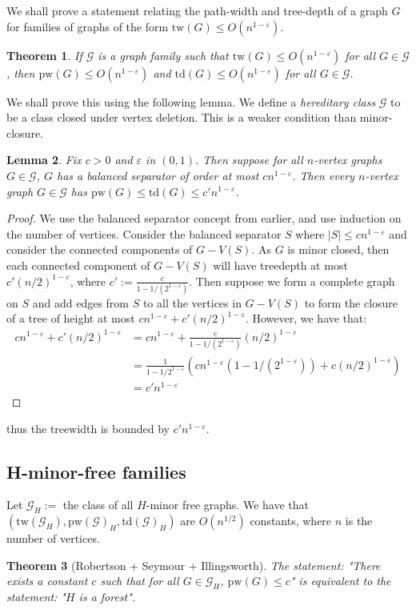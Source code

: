 \documentclass[]{article}
\newcommand{\tw}{\text{tw}}
\newcommand{\pw}{\text{pw}}
\newcommand{\td}{\text{td}}
\newtheorem{theorem}{Theorem}
\newtheorem{lemma}[theorem]{Lemma}
\theoremstyle{definition}
\numberwithin{theorem}{section}
\numberwithin{equation}{section}
\begin{document}
We shall prove a statement relating the path-width and tree-depth of a graph $G$ for families of graphs of the form $\tw(G) \leq O(n^{1- \varepsilon})$. 
\begin{theorem}
	If $\mathcal{G}$ is a graph family such that $\tw(G) \leq O(n^{1- \varepsilon})$ for all $G \in \mathcal{G}$, then $\pw(G) \leq O(n^{1-\varepsilon})$ and $\td(G) \leq O(n^{1-\varepsilon})$ for all $G \in \mathcal{G}$.
\end{theorem}
We shall prove this using the following lemma. We define a \textit{hereditary class} $\mathcal{G}$ to be a class closed under vertex deletion. This is a weaker condition than minor-closure. 
\begin{lemma}
	Fix $c > 0$ and $\varepsilon$ in $(0, 1)$. Then suppose for all $n$-vertex graphs $G \in \mathcal{G}$, $G$ has a balanced separator of order at most $c n^{1-\varepsilon}$. Then every $n$-vertex graph $G \in \mathcal{G}$ has $\pw(G) \leq \td(G) \leq c' n^{1- \varepsilon}$. 
\end{lemma}
\begin{proof}
	We use the balanced separator concept from earlier, and use induction on the number of vertices. Consider the balanced separator $S$ where $|S| \leq cn^{1-\varepsilon}$ and consider the connected components of $G - V(S)$. As $G$ is minor closed, then each connected component of $G - V(S)$ will have treedepth at most $c'(n/2)^{1 - \varepsilon}$, where $c' := \frac{c}{1 - 1/(2^{1-\varepsilon})}$. Then suppose we form a complete graph on $S$ and add edges from $S$ to all the vertices in $G - V(S)$ to form the closure of a tree of height at most $c n^{1 - \varepsilon} + c'(n/2)^{1 - \varepsilon}$. However, we have that:
	\begin{align*}
		c n^{1 - \varepsilon} + c'(n/2)^{1 - \varepsilon} &= c n^{1 - \varepsilon} + \frac{c}{1 - 1/(2^{1-\varepsilon})}(n/2)^{1 - \varepsilon}\\
		&= \frac{1}{1 - 1/2^{1-\varepsilon}} (c n^{1 - \varepsilon}(1 - 1/(2^{1-\varepsilon})) + c (n/2)^{1 - \varepsilon})\\
		&= c'n^{1 - \varepsilon}
	\end{align*}
\end{proof}
thus the treewidth is bounded by $c' n^{1-\varepsilon}$. 

\subsection{H-minor-free families}
Let $\mathcal{G}_H:=$ the class of all $H$-minor free graphs.
We have that $(\tw(\mathcal{G}_H), \pw(\mathcal{G})_H, \td(\mathcal{G})_H)$ are $O(n^{1/2})$ constants, where $n$ is the number of vertices. 
\begin{theorem}[Robertson + Seymour + Illingsworth]
	The statement: "There exists a constant $c$ such that for all $G \in \mathcal{G}_H$, $\pw(G) \leq c$" is equivalent to the statement: "$H$ is a forest".
\end{theorem}
\end{document}
